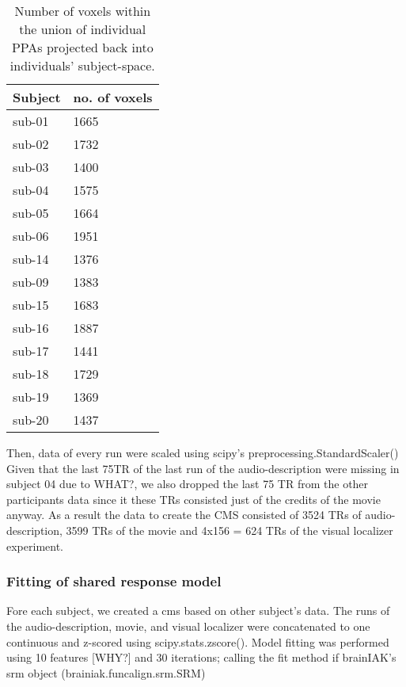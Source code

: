 \begin{table*}[btp]
\caption{Number of voxels within the union of individual PPAs projected back
    into individuals' subject-space.}
\label{tab:ppamaskvoxels}
\begin{tabular}{ll}
\toprule
\textbf{Subject} & \textbf{no. of voxels} \\
\midrule
sub-01 & 1665 \tabularnewline
sub-02 & 1732 \tabularnewline
sub-03 & 1400 \tabularnewline
sub-04 & 1575 \tabularnewline
sub-05 & 1664 \tabularnewline
sub-06 & 1951 \tabularnewline
sub-14 & 1376 \tabularnewline
sub-09 & 1383 \tabularnewline
sub-15 & 1683 \tabularnewline
sub-16 & 1887 \tabularnewline
sub-17 & 1441 \tabularnewline
sub-18 & 1729 \tabularnewline
sub-19 & 1369 \tabularnewline
sub-20 & 1437 \tabularnewline
\bottomrule
\end{tabular}
\end{table*}

Then, data of every run were scaled using scipy's preprocessing.StandardScaler()
Given that the last 75TR of the last run of the audio-description were missing
in subject 04 due to WHAT?, we also dropped the last 75 TR from the other
participants data since it these TRs consisted just of the credits of the movie
anyway.
As a result the data to create the CMS consisted of 3524 TRs of
audio-description, 3599 TRs of the movie and 4x156 = 624 TRs of the visual
localizer experiment.

\subsubsection{Fitting of shared response model}




Fore each subject, we created a \ac{cms} based on other subject's data.
%
The runs of the audio-description, movie, and visual localizer were concatenated
to one continuous and z-scored using scipy.stats.zscore().
Model fitting was performed using 10 features [WHY?] and 30 iterations;
calling the fit method if brainIAK's srm object (brainiak.funcalign.srm.SRM)

